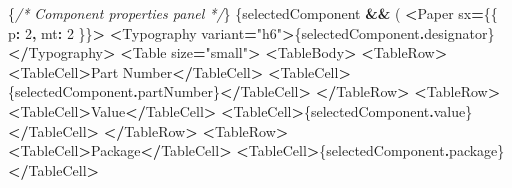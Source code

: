 \documentclass[
]{article}
\newenvironment{Shaded}{\begin{snugshade}}{\end{snugshade}}
\newcommand{\AttributeTok}[1]{\textcolor[rgb]{0.13,0.29,0.53}{#1}}
\newcommand{\BuiltInTok}[1]{#1}
\newcommand{\CommentTok}[1]{\textcolor[rgb]{0.56,0.35,0.01}{\textit{#1}}}
\newcommand{\DecValTok}[1]{\textcolor[rgb]{0.00,0.00,0.81}{#1}}
\newcommand{\NormalTok}[1]{#1}
\newcommand{\OperatorTok}[1]{\textcolor[rgb]{0.81,0.36,0.00}{\textbf{#1}}}
\newcommand{\StringTok}[1]{\textcolor[rgb]{0.31,0.60,0.02}{#1}}
\begin{document}
\begin{Shaded}
\begin{Highlighting}[]
\NormalTok{      \{}\CommentTok{/* Component properties panel */}\NormalTok{\}}
\NormalTok{      \{selectedComponent }\OperatorTok{\&\&}\NormalTok{ (}
        \OperatorTok{\textless{}}\NormalTok{Paper sx}\OperatorTok{=}\NormalTok{\{\{ p}\OperatorTok{:} \DecValTok{2}\OperatorTok{,}\NormalTok{ mt}\OperatorTok{:} \DecValTok{2}\NormalTok{ \}\}}\OperatorTok{\textgreater{}}
          \OperatorTok{\textless{}}\NormalTok{Typography variant}\OperatorTok{=}\StringTok{"h6"}\OperatorTok{\textgreater{}}\NormalTok{\{selectedComponent}\OperatorTok{.}\AttributeTok{designator}\NormalTok{\}}\OperatorTok{\textless{}/}\NormalTok{Typography}\OperatorTok{\textgreater{}}
          \OperatorTok{\textless{}}\NormalTok{Table size}\OperatorTok{=}\StringTok{"small"}\OperatorTok{\textgreater{}}
            \OperatorTok{\textless{}}\NormalTok{TableBody}\OperatorTok{\textgreater{}}
              \OperatorTok{\textless{}}\NormalTok{TableRow}\OperatorTok{\textgreater{}}
                \OperatorTok{\textless{}}\NormalTok{TableCell}\OperatorTok{\textgreater{}}\NormalTok{Part }\BuiltInTok{Number}\OperatorTok{\textless{}/}\NormalTok{TableCell}\OperatorTok{\textgreater{}}
                \OperatorTok{\textless{}}\NormalTok{TableCell}\OperatorTok{\textgreater{}}\NormalTok{\{selectedComponent}\OperatorTok{.}\AttributeTok{partNumber}\NormalTok{\}}\OperatorTok{\textless{}/}\NormalTok{TableCell}\OperatorTok{\textgreater{}}
              \OperatorTok{\textless{}/}\NormalTok{TableRow}\OperatorTok{\textgreater{}}
              \OperatorTok{\textless{}}\NormalTok{TableRow}\OperatorTok{\textgreater{}}
                \OperatorTok{\textless{}}\NormalTok{TableCell}\OperatorTok{\textgreater{}}\NormalTok{Value}\OperatorTok{\textless{}/}\NormalTok{TableCell}\OperatorTok{\textgreater{}}
                \OperatorTok{\textless{}}\NormalTok{TableCell}\OperatorTok{\textgreater{}}\NormalTok{\{selectedComponent}\OperatorTok{.}\AttributeTok{value}\NormalTok{\}}\OperatorTok{\textless{}/}\NormalTok{TableCell}\OperatorTok{\textgreater{}}
              \OperatorTok{\textless{}/}\NormalTok{TableRow}\OperatorTok{\textgreater{}}
              \OperatorTok{\textless{}}\NormalTok{TableRow}\OperatorTok{\textgreater{}}
                \OperatorTok{\textless{}}\NormalTok{TableCell}\OperatorTok{\textgreater{}}\NormalTok{Package}\OperatorTok{\textless{}/}\NormalTok{TableCell}\OperatorTok{\textgreater{}}
                \OperatorTok{\textless{}}\NormalTok{TableCell}\OperatorTok{\textgreater{}}\NormalTok{\{selectedComponent}\OperatorTok{.}\AttributeTok{package}\NormalTok{\}}\OperatorTok{\textless{}/}\NormalTok{TableCell}\OperatorTok{\textgreater{}}

\end{Highlighting}
\end{Shaded}
\end{document}
